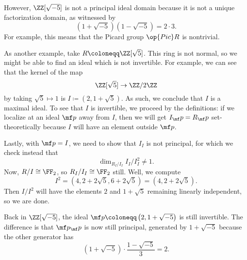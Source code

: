 \documentclass[../notes.tex]{subfiles}
\begin{document}
However, $\ZZ[\sqrt{-5}]$ is not a principal ideal domain because it is not a unique factorization domain, as witnessed by
\[\left(1+\sqrt{-5}\right)\left(1-\sqrt{-5}\right)=2\cdot3.\]
For example, this means that the Picard group $\op{Pic}R$ is nontrivial.

As another example, take $R\coloneqq\ZZ[\sqrt5]$. This ring is not normal, so we might be able to find an ideal which is not invertible. For example, we can see that the kernel of the map
\[\ZZ[\sqrt5]\to\ZZ/2\ZZ\]
by taking $\sqrt5\mapsto1$ is $I\coloneqq\left(2,1+\sqrt5\right)$. As such, we conclude that $I$ is a maximal ideal. To see that $I$ is invertible, we proceed by the definitions: if we localize at an ideal $\mf p$ away from $I$, then we will get $I_\mf p=R_\mf p$ set-theoretically because $I$ will have an element outside $\mf p$.

Lastly, with $\mf p=I$, we need to show that $I_I$ is not principal, for which we check instead that
\[\dim_{R_I/I_I}I_I/I_I^2\ne1.\]
Now, $R/I\cong\FF_2$, so $R_I/I_I\cong\FF_2$ still. Well, we compute
\[I^2=\left(4,2+2\sqrt5,6+2\sqrt5\right)=\left(4,2+2\sqrt5\right).\]
Then $I/I^2$ will have the elements $2$ and $1+\sqrt5$ remaining linearly independent, so we are done.
\begin{remark}
	Back in $\ZZ[\sqrt{-5}]$, the ideal $\mf p\coloneqq\left(2,1+\sqrt{-5}\right)$ is still invertible. The difference is that $\mf p_\mf p$ is now still principal, generated by $1+\sqrt{-5}$ because the other generator has
	\[\left(1+\sqrt{-5}\right)\cdot\frac{1-\sqrt{-5}}3=2.\]
\end{remark}
\end{document}
